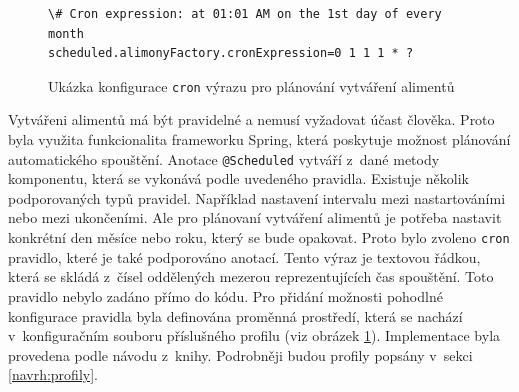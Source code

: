             \begin{figure}
                \begin{verbatim}
\# Cron expression: at 01:01 AM on the 1st day of every month
scheduled.alimonyFactory.cronExpression=0 1 1 1 * ?
                \end{verbatim}
                \caption{Ukázka konfigurace \texttt{cron} výrazu pro plánování vytváření alimentů} 
                \label{code:cron-expression}
            \end{figure}
            Vytvářeni alimentů má být pravidelné a nemusí vyžadovat účast člověka. Proto byla využita funkcionalita frameworku Spring, která poskytuje možnost plánování automatického spouštění.\cite{spring-scheduling} Anotace \verb|@Scheduled| vytváří z~dané metody komponentu, která se vykonává podle uvedeného pravidla. Existuje několik podporovaných typů pravidel. 
            Například nastavení intervalu mezi nastartováními nebo mezi ukončeními. Ale pro plánovaní vytváření alimentů je potřeba nastavit konkrétní den měsíce nebo roku, který se bude opakovat. Proto bylo zvoleno \verb|cron| pravidlo, které je také podporováno anotací.\cite{cron-expression} Tento výraz je textovou řádkou, která se skládá z~čísel oddělených mezerou reprezentujících čas spouštění.
            Toto pravidlo nebylo zadáno přímo do kódu. Pro přidání možnosti pohodlné konfigurace pravidla byla definována proměnná prostředí, která se nachází v~konfiguračním souboru příslušného profilu (viz obrázek \ref{code:cron-expression}). Implementace byla provedena podle návodu z~knihy\cite{sbr:spring-task-scheduling}. Podrobněji budou profily popsány v~sekci \ref{navrh:profily}.
         
